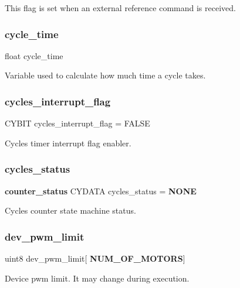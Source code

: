 This flag is set when an external reference command is received. \mbox{\label{globals_8c_a910e6d34a0bb2e8dbaf576e06bdf56f5}} 
\subsubsection{cycle\+\_\+time}
{\footnotesize\ttfamily float cycle\+\_\+time}

Variable used to calculate how much time a cycle takes. \mbox{\label{globals_8c_a9c58c534e60c7991a92a13d012e7ef86}} 
\subsubsection{cycles\+\_\+interrupt\+\_\+flag}
{\footnotesize\ttfamily C\+Y\+B\+IT cycles\+\_\+interrupt\+\_\+flag = F\+A\+L\+SE}

Cycles timer interrupt flag enabler. \mbox{\label{globals_8c_a9087b28d15f17c6475922ba6943b14f3}} 
\subsubsection{cycles\+\_\+status}
{\footnotesize\ttfamily \textbf{ counter\+\_\+status} C\+Y\+D\+A\+TA cycles\+\_\+status = \textbf{ N\+O\+NE}}

Cycles counter state machine status. \mbox{\label{globals_8c_ac7fdc35fc8e87ead9b45028d6034fb1b}} 
\subsubsection{dev\+\_\+pwm\+\_\+limit}
{\footnotesize\ttfamily uint8 dev\+\_\+pwm\+\_\+limit[\textbf{ N\+U\+M\+\_\+\+O\+F\+\_\+\+M\+O\+T\+O\+RS}]}

Device pwm limit. It may change during execution. \mbox{\label{globals_8c_a2e254e60f92958e2fdec99dde626dca6}} 
